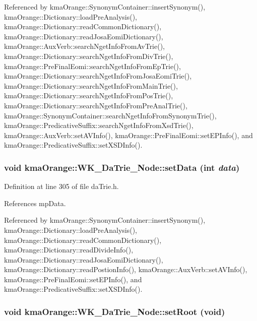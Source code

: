 Referenced by kmaOrange::SynonymContainer::insertSynonym(), kmaOrange::Dictionary::loadPreAnalysis(), kmaOrange::Dictionary::readCommonDictionary(), kmaOrange::Dictionary::readJosaEomiDictionary(), kmaOrange::AuxVerb::searchNgetInfoFromAvTrie(), kmaOrange::Dictionary::searchNgetInfoFromDivTrie(), kmaOrange::PreFinalEomi::searchNgetInfoFromEpTrie(), kmaOrange::Dictionary::searchNgetInfoFromJosaEomiTrie(), kmaOrange::Dictionary::searchNgetInfoFromMainTrie(), kmaOrange::Dictionary::searchNgetInfoFromPosTrie(), kmaOrange::Dictionary::searchNgetInfoFromPreAnalTrie(), kmaOrange::SynonymContainer::searchNgetInfoFromSynonymTrie(), kmaOrange::PredicativeSuffix::searchNgetInfoFromXsdTrie(), kmaOrange::AuxVerb::setAVInfo(), kmaOrange::PreFinalEomi::setEPInfo(), and kmaOrange::PredicativeSuffix::setXSDInfo().\hypertarget{classkmaOrange_1_1WK__DaTrie__Node_e2cd732b26b4423dfe36ea4513032924}{
\subsubsection[{setData}]{\setlength{\rightskip}{0pt plus 5cm}void kmaOrange::WK\_\-DaTrie\_\-Node::setData (int {\em data})}}
\label{classkmaOrange_1_1WK__DaTrie__Node_e2cd732b26b4423dfe36ea4513032924}




Definition at line 305 of file daTrie.h.

References mpData.

Referenced by kmaOrange::SynonymContainer::insertSynonym(), kmaOrange::Dictionary::loadPreAnalysis(), kmaOrange::Dictionary::readCommonDictionary(), kmaOrange::Dictionary::readDivideInfo(), kmaOrange::Dictionary::readJosaEomiDictionary(), kmaOrange::Dictionary::readPostionInfo(), kmaOrange::AuxVerb::setAVInfo(), kmaOrange::PreFinalEomi::setEPInfo(), and kmaOrange::PredicativeSuffix::setXSDInfo().\hypertarget{classkmaOrange_1_1WK__DaTrie__Node_e2af113cda423d743621f200903f104b}{
\subsubsection[{setRoot}]{\setlength{\rightskip}{0pt plus 5cm}void kmaOrange::WK\_\-DaTrie\_\-Node::setRoot (void)}}
\label{classkmaOrange_1_1WK__DaTrie__Node_e2af113cda423d743621f200903f104b}




